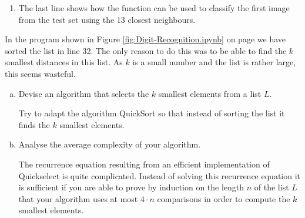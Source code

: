 \begin{enumerate}
      $\mytt{digit}(\mathbf{x}, k)$ computes those $k$ images in the training set  that are
       to the image $\mathbf{x}$, where  of images is defined in terms of the
       of the vectors that store these images.  From these $k$ closest images of the training
      set the function chooses the digit that occurs most frequently.  It returns a pair $(d, p)$ where $d$
      is the digit that is most frequently occurring in the list of $k$ neighbours and $p$ is the percentage
      of images in the $k$ neighbours of $\mathbf{x}$ that show the digit $d$.  The implementation works as follows:
      \begin{enumerate}[(a)]
      \item {} is the number of training examples.  In our case, $n = 50\,000$.
      \item {} is a list of pairs of the form $(d, i)$, where $d$ is the distance
            of the $i^\mathrm{th}$ image in the training set from the given image $x$.
      \item These pairs are  with respect to their distance and the labels corresponding to the
            images are computed.  Therefore,  is a list of the labels of all $50\,000$
            training images sorted according to their distance to the given image $x$.
      \item Finally, the function  takes the $k$ closest images and computes the digit that
            is most frequently occurring.
      \end{enumerate}
\item The last line shows how the function  can be used to classify the first image from the test
      set using the 13 closest neighbours. 
\end{enumerate}

\exercise
In the program shown in Figure \ref{fig:Digit-Recognition.ipynb} on page \pageref{fig:Digit-Recognition.ipynb}
we have sorted the list  in line 32.  The only reason to do this was to be able to find the $k$ smallest
distances in this list.  As $k$ is a small number and the list  is rather large, this seems wasteful.
\begin{enumerate}[(a)]
\item Devise an algorithm  that selects the $k$ smallest elements from a list $L$.

      \hint
      Try to adapt the algorithm QuickSort so that instead of sorting the list it finds the $k$ smallest elements.      
\item Analyse the average complexity of your algorithm.

      \hint
      The recurrence equation resulting from an efficient implementation of Quickselect is quite complicated.
      Instead of solving this recurrence equation it is sufficient if you are able to prove by induction on the
      length $n$ of the list $L$ that your algorithm uses at most $4 \cdot n$ comparisons in order to compute
      the $k$ smallest elements.
      \eox
\end{enumerate}   

